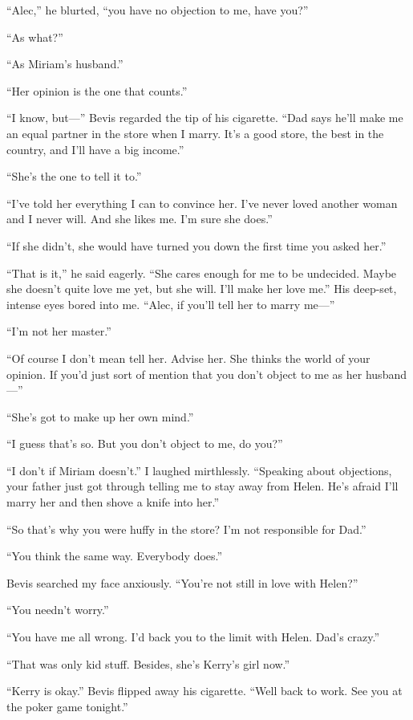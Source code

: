 \documentclass{novel}
\begin{document}
“Alec,” he blurted, “you have no objection to me, have you?”

“As what?”

“As Miriam’s husband.”

“Her opinion is the one that counts.”

“I know, but—” Bevis regarded the tip of his cigarette. “Dad says he’ll make me an equal partner in the store when I marry. It’s a good store, the best in the country, and I’ll have a big income.”

“She’s the one to tell it to.”

“I’ve told her everything I can to convince her. I’ve never loved another woman and I never will. And she likes me. I’m sure she does.”

“If she didn’t, she would have turned you down the first time you asked her.”

“That is it,” he said eagerly. “She cares enough for me to be undecided. Maybe she doesn’t quite love me yet, but she will. I’ll make her love me.” His deep-set, intense eyes bored into me. “Alec, if you’ll tell her to marry me—”

“I’m not her master.”

“Of course I don’t mean tell her. Advise her. She thinks the world of your opinion. If you’d just sort of mention that you don’t object to me as her husband—”

“She’s got to make up her own mind.”

“I guess that’s so. But you don’t object to me, do you?”

“I don’t if Miriam doesn’t.” I laughed mirthlessly. “Speaking about objections, your father just got through telling me to stay away from Helen. He’s afraid I’ll marry her and then shove a knife into her.”

“So that’s why you were huffy in the store? I’m not responsible for Dad.”

“You think the same way. Everybody does.”

Bevis searched my face anxiously. “You’re not still in love with Helen?”

“You needn’t worry.”

“You have me all wrong. I’d back you to the limit with Helen. Dad’s crazy.”

“That was only kid stuff. Besides, she’s Kerry’s girl now.”

“Kerry is okay.” Bevis flipped away his cigarette. “Well back to work. See you at the poker game tonight.”
\end{document}
